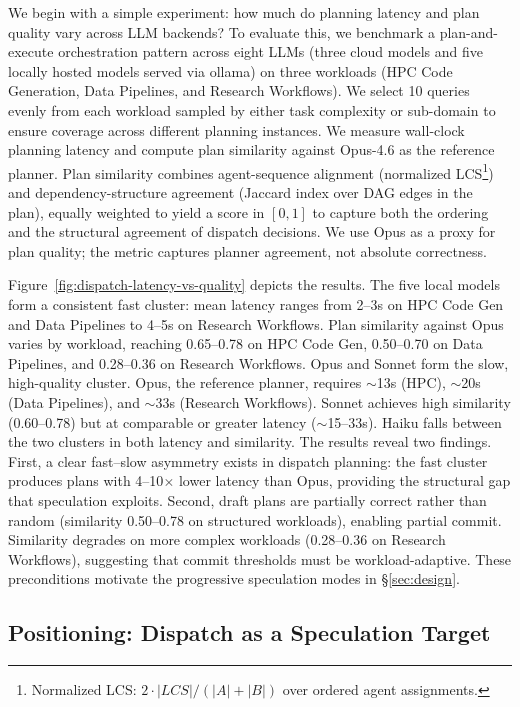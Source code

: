 \documentclass[conference,10pt]{IEEEtran}
\begin{document}
We begin with a simple experiment: how much do planning latency and plan quality vary across LLM backends? To evaluate this, we benchmark a plan-and-execute orchestration pattern across eight LLMs (three cloud models and five locally hosted models served via ollama) on three workloads (HPC Code Generation, Data Pipelines, and Research Workflows). We select 10 queries evenly from each workload sampled by either task complexity or sub-domain to ensure coverage across different planning instances. We measure wall-clock planning latency and compute plan similarity against Opus-4.6 as the reference planner. Plan similarity combines agent-sequence alignment (normalized LCS\footnote{Normalized LCS: $2 \cdot |LCS| / (|A| + |B|)$ over ordered agent assignments.}) and dependency-structure agreement (Jaccard index over DAG edges in the plan), equally weighted to yield a score in $[0,1]$ to capture both the ordering and the structural agreement of dispatch decisions. We use Opus as a proxy for plan quality; the metric captures planner agreement, not absolute correctness.

Figure~\ref{fig:dispatch-latency-vs-quality} depicts the results. The five local models form a consistent fast cluster: mean latency ranges from 2--3s on HPC Code Gen and Data Pipelines to 4--5s on Research Workflows. Plan similarity against Opus varies by workload, reaching 0.65--0.78 on HPC Code Gen, 0.50--0.70 on Data Pipelines, and 0.28--0.36 on Research Workflows. Opus and Sonnet form the slow, high-quality cluster. Opus, the reference planner, requires ${\sim}$13s (HPC), ${\sim}$20s (Data Pipelines), and ${\sim}$33s (Research Workflows). Sonnet achieves high similarity (0.60--0.78) but at comparable or greater latency (${\sim}$15--33s). Haiku falls between the two clusters in both latency and similarity. The results reveal two findings. First, a clear fast--slow asymmetry exists in dispatch planning: the fast cluster produces plans with 4--10$\times$ lower latency than Opus, providing the structural gap that speculation exploits. Second, draft plans are partially correct rather than random (similarity 0.50--0.78 on structured workloads), enabling partial commit. Similarity degrades on more complex workloads (0.28--0.36 on Research Workflows), suggesting that commit thresholds must be workload-adaptive. These preconditions motivate the progressive speculation modes in \S\ref{sec:design}.

\subsection{Positioning: Dispatch as a Speculation Target}
\end{document}
